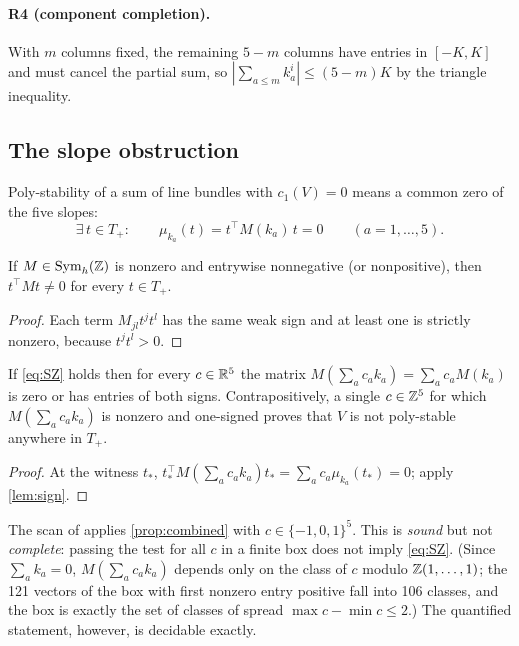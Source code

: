\paragraph{R4 (component completion).} With $m$ columns fixed, the remaining
$5-m$ columns have entries in $[-K,K]$ and must cancel the partial sum, so
$|\sum_{a\le m}k_a^i|\le(5-m)K$ by the triangle inequality.

\subsection{The slope obstruction}
\label{sec:slope}

Poly-stability of a sum of line bundles with $c_1(V)=0$ means a common zero of
the five slopes:
\begin{equation}\tag{SZ}\label{eq:SZ}
\exists\,t\in T_+:\qquad \mu_{k_a}(t)=t^\top M(k_a)\,t=0\qquad(a=1,\dots,5).
\end{equation}

\begin{lemma}\label{lem:sign}
If $M\in\operatorname{Sym}_h(\mathbb{Z})$ is nonzero and entrywise nonnegative (or nonpositive), then
$t^\top Mt\neq0$ for every $t\in T_+$.
\end{lemma}
\begin{proof}
Each term $M_{jl}t^jt^l$ has the same weak sign and at least one is strictly
nonzero, because $t^jt^l>0$.
\end{proof}

\begin{proposition}\label{prop:combined}
If \eqref{eq:SZ} holds then for every $c\in\mathbb{R}^5$ the matrix
$M(\sum_ac_ak_a)=\sum_ac_aM(k_a)$ is zero or has entries of both signs.
Contrapositively, a single $c\in\mathbb{Z}^5$ for which $M(\sum_ac_ak_a)$ is nonzero and
one-signed proves that $V$ is not poly-stable anywhere in $T_+$.
\end{proposition}
\begin{proof}
At the witness $t_*$, $t_*^\top M(\sum_ac_ak_a)t_*=\sum_ac_a\mu_{k_a}(t_*)=0$;
apply \cref{lem:sign}.
\end{proof}

The scan of \cite{ACGLP2013} applies \cref{prop:combined} with
$c\in\{-1,0,1\}^5$. This is \emph{sound} but not \emph{complete}: passing the
test for all $c$ in a finite box does not imply \eqref{eq:SZ}. (Since
$\sum_ak_a=0$, $M(\sum_ac_ak_a)$ depends only on the class of $c$ modulo
$\mathbb{Z}(1,\dots,1)$; the 121 vectors of the box with first nonzero entry positive
fall into 106 classes, and the box is exactly the set of classes of spread
$\max c-\min c\le2$.) The quantified statement, however, is decidable exactly.

